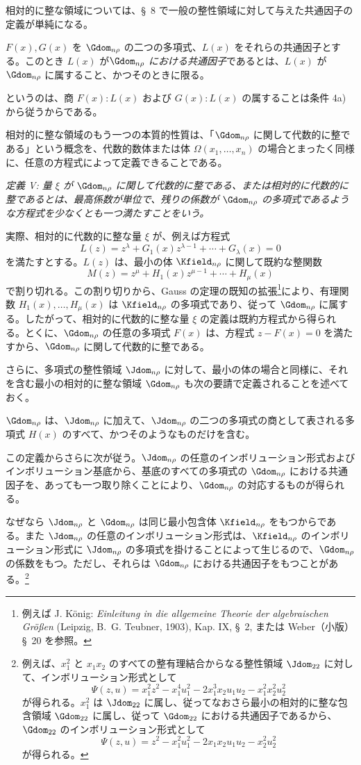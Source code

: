 \documentclass[11pt]{article}
\begin{document}
相対的に整な領域については、\S\ 8 で一般の整性領域に対して与えた共通因子の定義が単純になる。

$F(x),G(x)$ を $\Gdom_{n\rho}$ の二つの多項式、$L(x)$ をそれらの共通因子とする。このとき $L(x)$ が\emph{$\Gdom_{n\rho}$ における共通因子}であるとは、$L(x)$ が $\Gdom_{n\rho}$ に属すること、かつそのときに限る。

というのは、商 $F(x):L(x)$ および $G(x):L(x)$ の属することは条件 4a) から従うからである。

相対的に整な領域のもう一つの本質的性質は、「$\Gdom_{n\rho}$ に関して代数的に整である」という概念を、代数的数体または体 $\Omega(x_1,\ldots,x_n)$ の場合とまったく同様に、任意の方程式によって定義できることである。

\emph{定義 V: 量 $\xi$ が $\Gdom_{n\rho}$ に関して代数的に整である、または相対的に代数的に整であるとは、最高係数が単位で、残りの係数が $\Gdom_{n\rho}$ の多項式であるような方程式を少なくとも一つ満たすことをいう。}

実際、相対的に代数的に整な量 $\xi$ が、例えば方程式
\[
  L(z)=z^\lambda+G_1(x)z^{\lambda-1}+\cdots+G_\lambda(x)=0
\]
を満たすとする。$L(z)$ は、最小の体 $\Kfield_{n\rho}$ に関して既約な整関数
\[
  M(z)=z^\mu+H_1(x)z^{\mu-1}+\cdots+H_\mu(x)
\]
で割り切れる。この割り切りから、Gauss の定理の既知の拡張\footnote{例えば J. König: \emph{Einleitung in die allgemeine Theorie der algebraischen Größen} (Leipzig, B.~G. Teubner, 1903), Kap. IX, \S\ 2, または Weber（小版）\S\ 20 を参照。}により、有理関数 $H_1(x),\ldots,H_\mu(x)$ は $\Kfield_{n\rho}$ の多項式であり、従って $\Gdom_{n\rho}$ に属する。したがって、相対的に代数的に整な量 $\xi$ の定義は既約方程式から得られる。とくに、$\Gdom_{n\rho}$ の任意の多項式 $F(x)$ は、方程式 $z-F(x)=0$ を満たすから、$\Gdom_{n\rho}$ に関して代数的に整である。

さらに、多項式の整性領域 $\Jdom_{n\rho}$ に対して、最小の体の場合と同様に、それを含む最小の相対的に整な領域 $\Gdom_{n\rho}$ も次の要請で定義されることを述べておく。

$\Gdom_{n\rho}$ は、$\Jdom_{n\rho}$ に加えて、$\Jdom_{n\rho}$ の二つの多項式の商として表される多項式 $H(x)$ のすべて、かつそのようなものだけを含む。

この定義からさらに次が従う。$\Jdom_{n\rho}$ の任意のインボリューション形式およびインボリューション基底から、基底のすべての多項式の $\Gdom_{n\rho}$ における共通因子を、あっても一つ取り除くことにより、$\Gdom_{n\rho}$ の対応するものが得られる。

なぜなら $\Jdom_{n\rho}$ と $\Gdom_{n\rho}$ は同じ最小包含体 $\Kfield_{n\rho}$ をもつからである。また $\Jdom_{n\rho}$ の任意のインボリューション形式は、$\Kfield_{n\rho}$ のインボリューション形式に $\Jdom_{n\rho}$ の多項式を掛けることによって生じるので、$\Gdom_{n\rho}$ の係数をもつ。ただし、それらは $\Gdom_{n\rho}$ における共通因子をもつことがある。\footnote{例えば、$x_1^2$ と $x_1x_2$ のすべての整有理結合からなる整性領域 $\Jdom_{22}$ に対して、インボリューション形式として
\[
\Psi(z,u)=x_1^2z^2-x_1^4u_1^2-2x_1^3x_2u_1u_2-x_1^2x_2^2u_2^2
\]
が得られる。$x_1^2$ は $\Jdom_{22}$ に属し、従ってなおさら最小の相対的に整な包含領域 $\Gdom_{22}$ に属し、従って $\Gdom_{22}$ における共通因子であるから、$\Gdom_{22}$ のインボリューション形式として
\[
\Psi(z,u)=z^2-x_1^2u_1^2-2x_1x_2u_1u_2-x_2^2u_2^2
\]
が得られる。}
\end{document}

